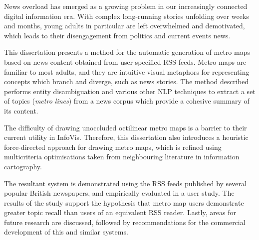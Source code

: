 \begin{center}
\parbox{\textwidth-3.8cm}{
News overload has emerged as a growing problem in our increasingly connected digital information era. With complex long-running stories unfolding over weeks and months, young adults in particular are left overwhelmed and demotivated, which leads to their disengagement from politics and current events news.\vspace{0.2cm}

This dissertation presents a method for the automatic generation of metro maps based on news content obtained from user-specified RSS feeds. Metro maps are familiar to most adults, and they are intuitive visual metaphors for representing concepts which branch and diverge, such as news stories. The method described performs entity disambiguation and various other NLP techniques to extract a set of topics (\textit{metro lines}) from a news corpus which provide a cohesive summary of its content.\vspace{0.2cm}

The difficulty of drawing unoccluded octilinear metro maps is a barrier to their current utility in InfoVis. Therefore, this dissertation also introduces a heuristic force-directed approach for drawing metro maps, which is refined using multicriteria optimisations taken from neighbouring literature in information cartography.\vspace{0.2cm}

The resultant system is demonstrated using the RSS feeds published by several popular British newspapers, and empirically evaluated in a user study. The results of the study support the hypothesis that metro map users demonstrate greater topic recall than users of an equivalent RSS reader. Lastly, areas for future research are discussed, followed by recommendations for the commercial development of this and similar systems.
}
\end{center}